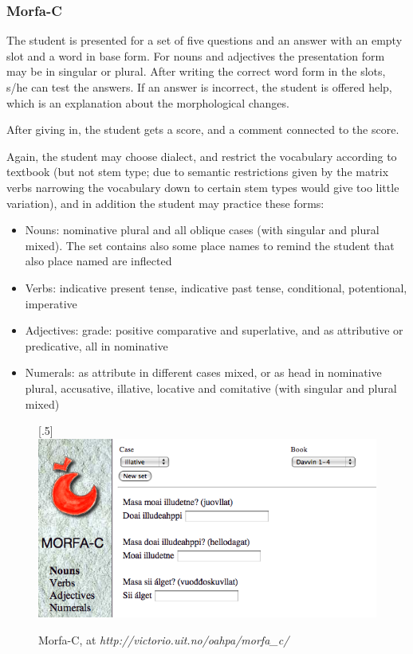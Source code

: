 \documentclass[a4paper,12pt]{article}
\begin{document}
\subsubsection{Morfa-C}
The student is presented for a set of five questions and an answer with an empty slot and a word in base form. For nouns and adjectives the presentation form may be in singular or plural. After writing the correct word form in the slots, s/he can test the answers. If an answer is incorrect, the student is offered help, which is an explanation about the morphological changes.

After giving in, the student gets a score, and a comment connected to the score. 

Again, the student may choose dialect, and restrict the vocabulary according to textbook (but not stem type; due to semantic restrictions given by the matrix verbs narrowing the vocabulary down to certain stem types would give too little variation), and in addition the student may practice these forms:
\begin{itemize}
\item Nouns: nominative plural and all oblique cases (with singular and plural mixed). The set contains also some place names to remind the student that also place named are inflected
\item Verbs: indicative present tense, indicative past tense, conditional, potentional, imperative
\item Adjectives: grade: positive comparative and superlative, and as attributive or predicative, all in nominative
\item Numerals: as attribute in different cases mixed, or as head in nominative plural, accusative, illative, locative and comitative (with singular and plural mixed)
\end{itemize}
\vspace{0.5cm}


\begin{figure}[htbp]
\begin{center}
\scalebox{.5}[.5]{\includegraphics{presentation/img/morfaC.png}}\\
\caption{Morfa-C, at \textit{http://victorio.uit.no/oahpa/morfa\_c/}}
\label{morfac}
\end{center}
\end{figure}
\end{document}
